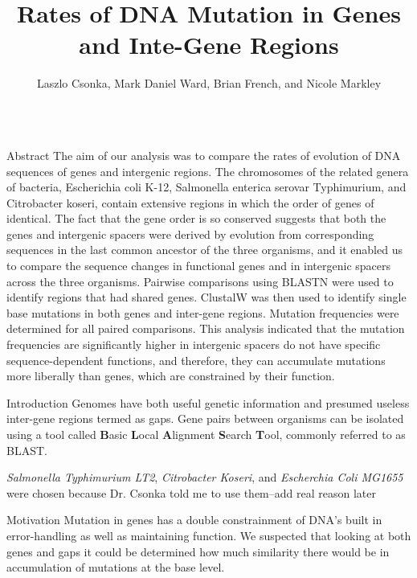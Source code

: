 \documentclass[final]{beamer}
\title[Fancy Posters]{Rates of DNA Mutation in Genes and Inte-Gene Regions}
\author{Laszlo Csonka, Mark Daniel Ward, Brian French, and Nicole Markley}
\institute{Department of Biology, Purdue University, West Lafayette, IN}
\begin{document}
  \begin{frame}{}
    \begin{columns}[t]


    \begin{column}{.32 \linewidth}
    \begin{block}{\large Abstract}
The aim of our analysis was to compare the rates of evolution of DNA sequences of genes and intergenic regions. The chromosomes of the related genera of bacteria, Escherichia coli K-12, Salmonella enterica serovar Typhimurium, and Citrobacter koseri, contain extensive regions in which the order of genes of identical. The fact that the gene order is so conserved suggests that both the genes and intergenic spacers were derived by evolution from corresponding sequences in the last common ancestor of the three organisms, and it enabled us to compare the sequence changes in functional genes and in intergenic spacers across the three organisms.
\newline
\newline
Pairwise comparisons using BLASTN were used to identify regions that had shared genes. ClustalW was then used to identify single base mutations in both genes and inter-gene regions. Mutation frequencies were determined for all paired comparisons. This analysis indicated that the mutation frequencies are significantly higher in intergenic spacers do not have specific sequence-dependent functions, and therefore, they can accumulate mutations more liberally than genes, which are constrained by their function.
    \end{block}

\begin{block}{\large Introduction}
Genomes have both useful genetic information and presumed useless inter-gene regions termed as gaps. Gene pairs between organisms can be isolated using a tool called \textbf{B}asic \textbf{L}ocal \textbf{A}lignment \textbf{S}earch \textbf{T}ool, commonly referred to as BLAST. 

\newline
\textit{Salmonella Typhimurium LT2}, \textit{Citrobacter Koseri}, and \textit{Escherchia Coli MG1655} were chosen because Dr. Csonka told me to use them--add real reason later
\end{block}

 \begin{block}{\large Motivation}
Mutation in genes has a double constrainment of DNA's built in error-handling as well as maintaining function. We suspected that looking at both genes and gaps it could be determined how much similarity there would be in accumulation of mutations at the base level.
	\end{block}


\end{column}
\end{columns}
\end{frame}
\end{document}
